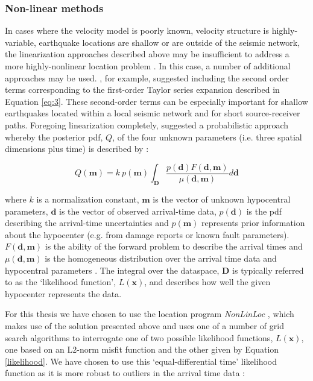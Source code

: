 \subsubsection{Non-linear methods}
In cases where the velocity model is poorly known, velocity structure is highly-variable, earthquake locations are shallow or are outside of the seismic network, the linearization approaches described above may be insufficient to address a more highly-nonlinear location problem \citep{thurber1985nonlinear}. In this case, a number of additional approaches may be used. \citet{thurber1985nonlinear}, for example, suggested including the second order terms corresponding to the first-order Taylor series expansion described in Equation \ref{eq:3}. These second-order terms can be especially important for shallow earthquakes located within a local seismic network and for short source-receiver paths. Foregoing linearization completely, \citet{tarantola1982inverse} suggested a probabilistic approach whereby the posterior \acrfull{pdf}, $Q$, of the four unknown parameters (i.e. three spatial dimensions plus time) is described by \citep{Lomax_2014}:

\begin{equation}
    Q(\mathbf{m}) = k\:p(\mathbf{m}) \int_{\mathbf{D}}^{} \frac{p(\mathbf{d})F(\mathbf{d},\mathbf{m})}{\mu(\mathbf{d},\mathbf{m})} d\mathbf{d}
\end{equation}

where $k$ is a normalization constant, $\mathbf{m}$ is the vector of unknown hypocentral parameters, $\mathbf{d}$ is the vector of observed arrival-time data, $p(\mathbf{d})$ is the \acrshort{pdf} describing the arrival-time uncertainties and $p(\mathbf{m})$ represents prior information about the hypocenter (e.g. from damage reports or known fault parameters). $F(\mathbf{d},\mathbf{m})$ is the ability of the forward problem to describe the arrival times and $\mu(\mathbf{d},\mathbf{m})$ is the homogeneous distribution over the arrival time data and hypocentral parameters \citep{Lomax_2014}. The integral over the dataspace, $\mathbf{D}$ is typically referred to as the `likelihood function', $L(\mathbf{x})$, and describes how well the given hypocenter represents the data.

For this thesis we have chosen to use the location program \textit{NonLinLoc} \citep{Lomax_2000}, which makes use of the solution presented above and uses one of a number of grid search algorithms to interrogate one of two possible likelihood functions, $L(\mathbf{x})$, one based on an L2-norm misfit function \citep{tarantola1982inverse} and the other given by Equation \ref{likelihood}. We have chosen to use this `equal-differential time' likelihood function as it is more robust to outliers in the arrival time data \citet{Lomax_2014}:


